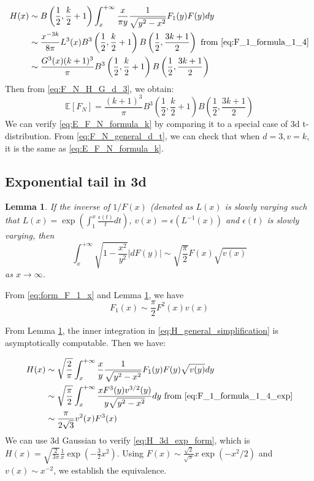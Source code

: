 \documentclass{article}
\newtheorem{lemma}{Lemma}
\def\E{\mathbb{E}}
\begin{document}
\begin{align}
    H(x)
    &\sim  B\left(\frac{1}{2},
    \frac{k}{2}+1\right)\int_x^{+\infty}
    \frac{x}{\pi y}\frac{1}{\sqrt{y^2-x^2}}
    F_1(y) F(y) dy\\
&\sim \frac{x^{-3k}}{8\pi} L^3(x)
B^3\left(\frac{1}{2}, \frac{k}{2}+1
\right) B\left(\frac{1}{2}, \frac{3k+1}{2}\right)
\textrm{ from } \eqref{eq:F_1_formula_1_4} \notag\\
& \sim\frac{G^3(x) (k+1)^3}{\pi}
B^3\left(\frac{1}{2}, \frac{k}{2}+1
\right) B\left(\frac{1}{2}, \frac{3k+1}{2}\right)
\end{align}
Then from \eqref{eq:F_N_H_G_d_3}, we obtain:
\begin{equation}\label{eq:E_F_N_formula_k}
    \E[F_N] = \frac{(k+1)^3}{\pi}B^3\left(\frac{1}{2}, \frac{k}{2}+1
    \right) B\left(\frac{1}{2}, \frac{3k+1}{2}\right)    
\end{equation}
We can verify \eqref{eq:E_F_N_formula_k} by comparing it to
a special case of 3d t-distribution. From
\eqref{eq:F_N_general_d_t}, we can check that when $d=3,v=k$,
it is the same as \eqref{eq:E_F_N_formula_k}.
\subsection{Exponential tail in 3d}
\begin{lemma}\label{lem:F_x_sqrt_11_exp}
    If the inverse of $1/F(x)$ (denoted as $L(x)$
    is slowly varying such that $L(x)=\exp\left(
        \int_1^x \frac{\epsilon(t)}{t}dt
    \right)$, $v(x)=\epsilon(L^{-1}(x))$ and $\epsilon(t)$ is slowly varying,
    then
    \begin{equation}
        \int_x^{+\infty} \sqrt{1-\frac{x^2}{y^2}}
        |d F(y)| \sim \sqrt{\frac{\pi}{2}} F(x) \sqrt{v(x)}
    \end{equation}
    as $x\to \infty$.
\end{lemma}
From \eqref{eq:form_F_1_x} and Lemma \ref{lem:F_x_sqrt_11_exp}, we have
\begin{equation}\label{eq:F_1_formula_1_4_exp}
    F_1(x) \sim \frac{\pi}{2}
    F^2(x)v(x)
\end{equation}

From Lemma \ref{lem:F_x_sqrt_11_exp},
the inner integration in \eqref{eq:H_general_simplification} is asymptotically
computable. Then we have:

\begin{align}
    H(x)
    &\sim \sqrt{\frac{2}{\pi}}\int_x^{+\infty}
    \frac{x}{ y}\frac{1}{\sqrt{y^2-x^2}}
    F_1(y) F(y)\sqrt{v(y)} dy\\
&\sim \sqrt{\frac{\pi }{2}}\int_x^{+\infty}
\frac{x F^3(y)v^{3/2}(y)}{y\sqrt{y^2-x^2}}dy
\textrm{ from } \eqref{eq:F_1_formula_1_4_exp} \notag\\
&\sim \frac{\pi}{2\sqrt{3}} v^2(x) F^3(x)\label{eq:H_3d_exp_form}
\end{align}
We can use 3d Gaussian to verify
\eqref{eq:H_3d_exp_form}, which is
$H(x) = \sqrt{\frac{2}{3\pi }}\frac{1}{x}\exp(-\frac{3}{2}x^2)$.
Using $F(x) \sim \frac{\sqrt{2}}{\sqrt{\pi}} x\exp(-x^2/2)$
and $v(x)\sim x^{-2}$, we establish the equivalence.
\end{document}
